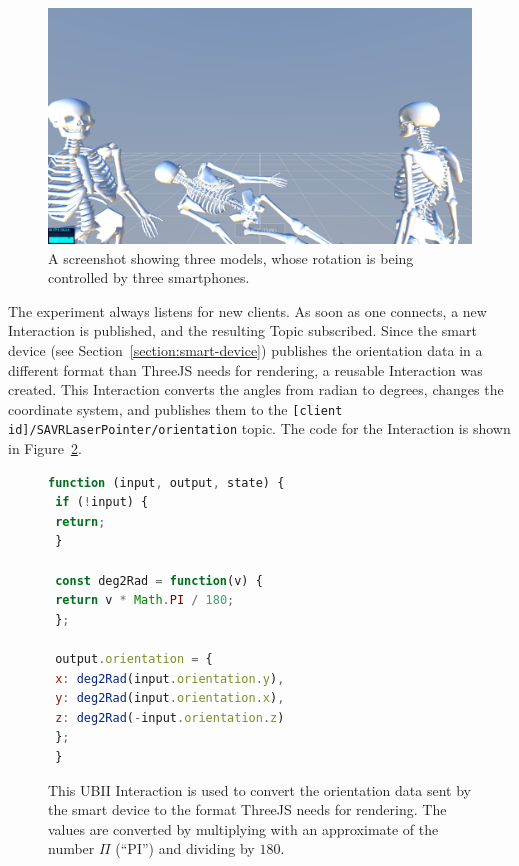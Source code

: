 \begin{figure}[H]
 \centering
 \includegraphics[width=12cm]{figures/implementation/screenshot_exp_mv.png}
 \caption[Screenshot of the model viewer experiment]{A screenshot showing three models, whose rotation is being controlled by three smartphones.}\label{fig:screenshot-exp-mv}
\end{figure}

The experiment always listens for new clients. As soon as one connects, a new Interaction is published, and the resulting Topic subscribed. Since the smart device (see Section~\ref{section:smart-device}) publishes the orientation data in a different format than ThreeJS needs for rendering, a reusable Interaction was created. This Interaction converts the angles from radian to degrees, changes the coordinate system, and publishes them to the \lstinline[breaklines=false]{[client id]/SAVRLaserPointer/orientation} topic. The code for the Interaction is shown in Figure~\ref{fig:ubii-interaction-angles}.

\begin{figure}[H]
 \begin{lstlisting}[language=JavaScript]
 function (input, output, state) {
 if (!input) {
 return;
 }

 const deg2Rad = function(v) {
 return v * Math.PI / 180;
 };

 output.orientation = {
 x: deg2Rad(input.orientation.y),
 y: deg2Rad(input.orientation.x),
 z: deg2Rad(-input.orientation.z)
 };
 }
 \end{lstlisting}
 \caption[Interaction of model viewer]{This \ac{UBII} Interaction is used to convert the orientation data sent by the smart device to the format ThreeJS needs for rendering. The values are converted by multiplying with an approximate of the number $\Pi$ (\enquote{PI}) and dividing by $180$.}\label{fig:ubii-interaction-angles} %
\end{figure}


